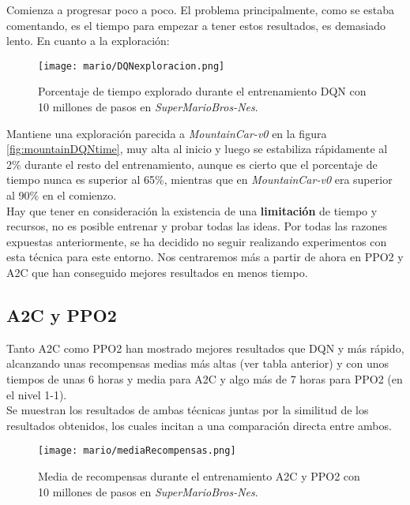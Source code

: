 \documentclass[11pt,fleqn]{book} %
\begin{document}
Comienza a progresar poco a poco. El problema principalmente, como se estaba comentando, es el tiempo para empezar a tener estos resultados, es demasiado lento. En cuanto a la exploración:

\begin{figure}[H]
	\centering\texttt{[image: mario/DQNexploracion.png]}
	\caption{Porcentaje de tiempo explorado durante el entrenamiento DQN con 10 millones de pasos en \textit{SuperMarioBros-Nes}.}
	\label{fig:marioDQNexploracion} %
\end{figure}

Mantiene una exploración parecida a \textit{MountainCar-v0} en la figura \ref{fig:mountainDQNtime}, muy alta al inicio y luego se estabiliza rápidamente al 2\% durante el resto del entrenamiento, aunque es cierto que el porcentaje de tiempo nunca es superior al 65\%, mientras que en \textit{MountainCar-v0} era superior al 90\% en el comienzo. \\

Hay que tener en consideración la existencia de una \textbf{limitación} de tiempo y recursos, no es posible entrenar y probar todas las ideas. Por todas las razones expuestas anteriormente, se ha decidido no seguir realizando experimentos con esta técnica para este entorno. Nos centraremos más a partir de ahora en PPO2 y A2C que han conseguido mejores resultados en menos tiempo.

\subsection{A2C y PPO2}

Tanto A2C como PPO2 han mostrado mejores resultados que DQN y más rápido, alcanzando unas recompensas medias más altas (ver tabla anterior) y con unos tiempos de unas 6 horas y media para A2C y algo más de 7 horas para PPO2 (en el nivel 1-1). \\

Se muestran los resultados de ambas técnicas juntas por la similitud de los resultados obtenidos, los cuales incitan a una comparación directa entre ambos.

\begin{figure}[H]
	\centering\texttt{[image: mario/mediaRecompensas.png]}
	\caption{Media de recompensas durante el entrenamiento A2C y PPO2 con 10 millones de pasos en \textit{SuperMarioBros-Nes}.}
	\label{fig:mariorecompensas} %
\end{figure}
\end{document}
